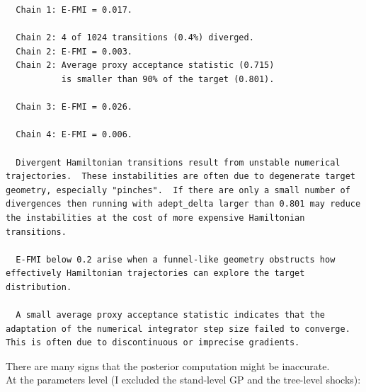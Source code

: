 \documentclass[
  letterpaper,
  DIV=11,
  numbers=noendperiod]{scrartcl}
\newenvironment{Shaded}{\begin{snugshade}}{\end{snugshade}}
\newcommand{\FunctionTok}[1]{\textcolor[rgb]{0.28,0.35,0.67}{#1}}
\newcommand{\NormalTok}[1]{\textcolor[rgb]{0.00,0.23,0.31}{#1}}
\newcommand{\OtherTok}[1]{\textcolor[rgb]{0.00,0.23,0.31}{#1}}
\newcommand{\SpecialCharTok}[1]{\textcolor[rgb]{0.37,0.37,0.37}{#1}}
\newcommand{\StringTok}[1]{\textcolor[rgb]{0.13,0.47,0.30}{#1}}
\begin{document}
\begin{verbatim}
  Chain 1: E-FMI = 0.017.

  Chain 2: 4 of 1024 transitions (0.4%) diverged.
  Chain 2: E-FMI = 0.003.
  Chain 2: Average proxy acceptance statistic (0.715)
           is smaller than 90% of the target (0.801).

  Chain 3: E-FMI = 0.026.

  Chain 4: E-FMI = 0.006.

  Divergent Hamiltonian transitions result from unstable numerical
trajectories.  These instabilities are often due to degenerate target
geometry, especially "pinches".  If there are only a small number of
divergences then running with adept_delta larger than 0.801 may reduce
the instabilities at the cost of more expensive Hamiltonian
transitions.

  E-FMI below 0.2 arise when a funnel-like geometry obstructs how
effectively Hamiltonian trajectories can explore the target
distribution.

  A small average proxy acceptance statistic indicates that the
adaptation of the numerical integrator step size failed to converge.
This is often due to discontinuous or imprecise gradients.
\end{verbatim}

\linespread{2}

There are many signs that the posterior computation might be
inaccurate.\\
At the parameters level (I excluded the stand-level GP and the
tree-level shocks):

\linespread{0.5}

\begin{Shaded}
\end{Shaded}
\end{document}
